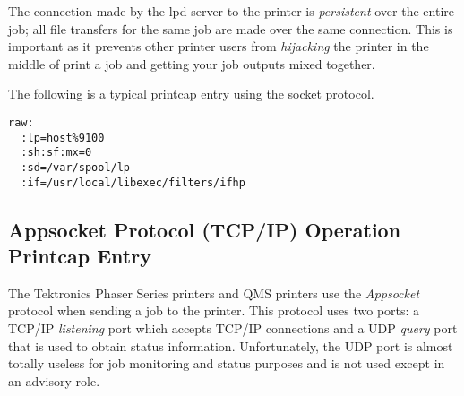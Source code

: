 \documentclass[a4paper]{article}
\begin{document}
The connection made by the {\ttfamily lpd} server
to the printer is {\itshape persistent\/} over the entire job;
all file transfers for the same job are made over the same
connection.
This is important as it prevents other printer users
from {\itshape hijacking\/} the printer in the middle of print a job
and getting your job outputs mixed together.

The following is a typical printcap entry using the socket protocol.
\begin{tscreen}
\begin{verbatim}
raw:
  :lp=host%9100
  :sh:sf:mx=0
  :sd=/var/spool/lp
  :if=/usr/local/libexec/filters/ifhp
\end{verbatim}
\end{tscreen}



\subsection{Appsocket Protocol (TCP/IP) Operation Printcap Entry
\label{appsocketpc}}

The Tektronics Phaser Series printers and QMS printers use the
{\itshape Appsocket\/} protocol when sending a job to the printer.
This protocol uses two ports: a TCP/IP {\itshape listening\/} port  which
accepts TCP/IP connections and a UDP {\itshape query\/} port that
is used to obtain status information.
Unfortunately,
the UDP port is almost totally useless for job monitoring and status
purposes and is not used except in an advisory role.
\end{document}
